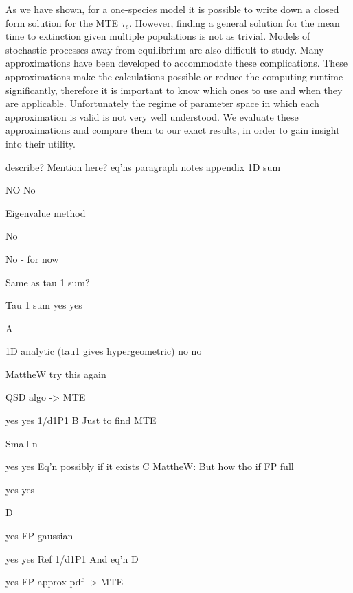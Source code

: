As we have shown, for a one-species model it is possible to write down a closed form solution for the MTE $\tau_e$.
However, finding a general solution for the mean time to extinction given multiple populations is not as trivial.
Models of stochastic processes away from equilibrium are also difficult to study.
Many approximations have been developed to accommodate these complications.
These approximations make the calculations possible or reduce the computing runtime significantly, therefore it is important to know which ones to use and when they are applicable.
Unfortunately the regime of parameter space in which each approximation is valid is not very well understood.
We evaluate these approximations and compare them to our exact results, in order to gain insight into their utility.
\iffalse


describe?
Mention here?
eq’ns
paragraph
notes
appendix
1D sum


NO
No








Eigenvalue method


No


No - for now




Same as tau 1 sum?


Tau 1 sum
yes
yes


A




1D analytic
(tau1 gives hypergeometric)
no
no




MattheW try this again


QSD algo -> MTE


yes
yes
1/d1P1
B
Just to find MTE


Small n


yes
yes
Eq’n possibly if it exists
C
MattheW: But how tho
if
FP full


yes
yes


D


yes
FP gaussian


yes
yes
Ref 1/d1P1
And eq’n
D


yes
FP approx pdf -> MTE


